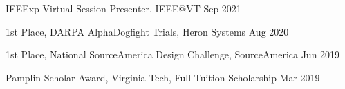 IEEExp Virtual Session Presenter, IEEE@VT                \hfill                              Sep 2021

1st Place, DARPA AlphaDogfight Trials, Heron Systems       \hfill                        Aug 2020

1st Place, National SourceAmerica Design Challenge, SourceAmerica \hfill                       Jun 2019

Pamplin Scholar Award, Virginia Tech, Full-Tuition Scholarship       \hfill                    Mar 2019

